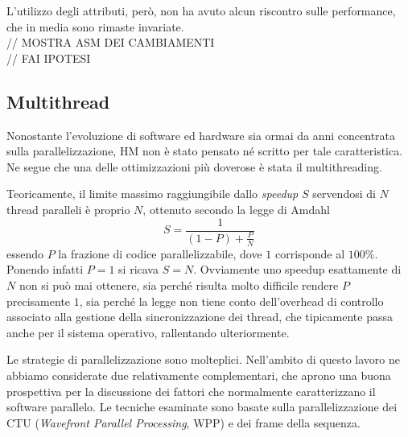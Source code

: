 L'utilizzo degli attributi, però, non ha avuto alcun riscontro sulle 
performance, che in media sono rimaste invariate. \\
// MOSTRA ASM DEI CAMBIAMENTI \\
// FAI IPOTESI
\label{sect-multi}\subsection{Multithread}
Nonostante l'evoluzione di software ed hardware sia ormai da anni concentrata 
sulla parallelizzazione, HM non è stato pensato né scritto per tale 
caratteristica. Ne segue che una delle ottimizzazioni più doverose è stata il 
multithreading.
\par Teoricamente, il limite massimo raggiungibile dallo \emph{speedup} $S$ 
servendosi 
di $N$ thread paralleli è proprio $N$, ottenuto secondo la legge di Amdahl
$$S = \frac{1}{(1-P)+\frac{P}{N}}$$
essendo $P$ la frazione di codice parallelizzabile, dove $1$ corrisponde al 
$100\%$. Ponendo infatti $P = 1$ si ricava $S = N$. Ovviamente uno speedup 
esattamente di $N$ non si può mai ottenere, sia perché risulta molto difficile 
rendere 
$P$ precisamente $1$, sia perché la legge non tiene conto dell'overhead di 
controllo associato alla gestione della sincronizzazione dei thread, che 
tipicamente passa anche per il sistema operativo, rallentando ulteriormente.
\par Le strategie di parallelizzazione sono molteplici. Nell'ambito di questo 
lavoro ne abbiamo considerate due relativamente complementari, che aprono
una buona prospettiva per la discussione dei fattori che normalmente 
caratterizzano il software parallelo. Le tecniche esaminate sono basate sulla 
parallelizzazione dei CTU (\emph{Wavefront Parallel Processing}, WPP) e dei 
frame della sequenza.

